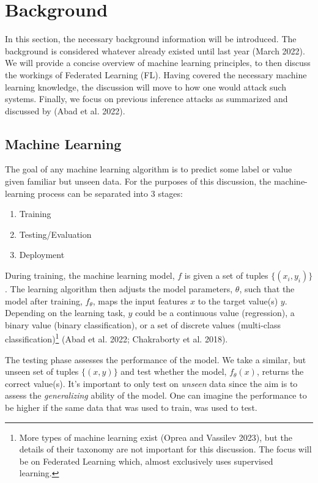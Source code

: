 \documentclass[
  compsoc]{IEEEtran}
\providecommand{\tightlist}{%
  \setlength{\itemsep}{0pt}\setlength{\parskip}{0pt}}
\begin{document}
\hypertarget{background}{%
\section{Background}\label{background}}

In this section, the necessary background information will be
introduced. The background is considered whatever already existed until
last year (March 2022). We will provide a concise overview of machine
learning principles, to then discuss the workings of Federated Learning
(FL). Having covered the necessary machine learning knowledge, the
discussion will move to how one would attack such systems. Finally, we
focus on previous inference attacks as summarized and discussed by (Abad
et al. 2022).

\hypertarget{machine-learning}{%
\subsection{Machine Learning}\label{machine-learning}}

The goal of any machine learning algorithm is to predict some label or
value given familiar but unseen data. For the purposes of this
discussion, the machine-learning process can be separated into 3 stages:

\begin{enumerate}
\def\labelenumi{\arabic{enumi}.}
\tightlist
\item
  Training
\item
  Testing/Evaluation
\item
  Deployment
\end{enumerate}

During training, the machine learning model, \(f\) is given a set of
tuples \(\{(x_i, y_i)\}\). The learning algorithm then adjusts the model
parameters, \(\theta\), such that the model after training,
\(f_\theta\), maps the input features \(x\) to the target value(s)
\(y\). Depending on the learning task, \(y\) could be a continuous value
(regression), a binary value (binary classification), or a set of
discrete values (multi-class classification)\footnote{More types of
  machine learning exist (Oprea and Vassilev 2023), but the details of
  their taxonomy are not important for this discussion. The focus will
  be on Federated Learning which, almost exclusively uses supervised
  learning.} (Abad et al. 2022; Chakraborty et al. 2018).

The testing phase assesses the performance of the model. We take a
similar, but unseen set of tuples \(\{(x, y)\}\) and test whether the
model, \(f_\theta(x)\), returns the correct value(s). It's important to
only test on \emph{unseen} data since the aim is to assess the
\emph{generalizing} ability of the model. One can imagine the
performance to be higher if the same data that was used to train, was
used to test.
\end{document}

